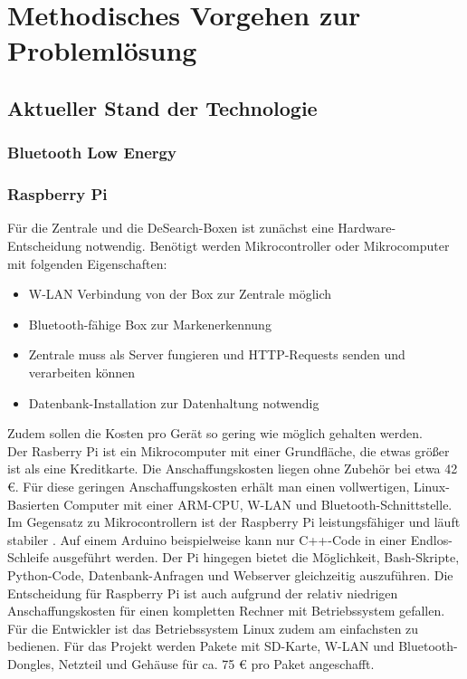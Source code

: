 \section{Methodisches Vorgehen zur Problemlösung}

\subsection{Aktueller Stand der Technologie}

\subsubsection{Bluetooth Low Energy}\label{sssec:BLE}

\subsubsection{Raspberry Pi}
Für die Zentrale und die DeSearch-Boxen ist zunächst eine Hardware-Entscheidung notwendig. Benötigt werden Mikrocontroller oder Mikrocomputer mit folgenden Eigenschaften:
\begin{itemize}
	\item W-LAN Verbindung von der Box zur Zentrale möglich
	\item Bluetooth-fähige Box zur Markenerkennung
	\item Zentrale muss als Server fungieren und HTTP-Requests senden und verarbeiten können
	\item Datenbank-Installation zur Datenhaltung notwendig
\end{itemize}
Zudem sollen die Kosten pro Gerät so gering wie möglich gehalten werden. \\
Der Rasberry Pi ist ein Mikrocomputer mit einer Grundfläche, die etwas größer ist als eine Kreditkarte. Die Anschaffungskosten liegen ohne Zubehör bei etwa 42 €. Für diese geringen Anschaffungskosten erhält man einen vollwertigen, Linux-Basierten Computer mit einer ARM-CPU, W-LAN und Bluetooth-Schnittstelle. Im Gegensatz zu Mikrocontrollern ist der Raspberry Pi leistungsfähiger und läuft stabiler \citep[Vgl.][S.35ff.]{raspi}. Auf einem Arduino beispielweise kann nur C++-Code in einer Endlos-Schleife ausgeführt werden. Der Pi hingegen bietet die Möglichkeit, Bash-Skripte, Python-Code, Datenbank-Anfragen und Webserver gleichzeitig auszuführen. Die Entscheidung für Raspberry Pi ist auch aufgrund der relativ niedrigen Anschaffungskosten für einen kompletten Rechner mit Betriebssystem gefallen. Für die Entwickler ist das Betriebssystem Linux zudem am einfachsten zu bedienen. Für das Projekt werden Pakete mit SD-Karte, W-LAN und Bluetooth-Dongles, Netzteil und Gehäuse für ca. 75 € pro Paket angeschafft.
